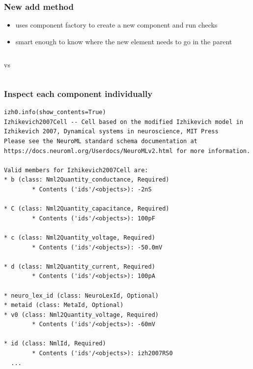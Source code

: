 \begin{frame}[t,fragile]
  \frametitle{New add method}
  \begin{itemize}
    \item uses component factory to create a new component and run checks
    \item smart enough to know where the new element needs to go in the parent
  \end{itemize}
  \begin{center}
    \inputminted[fontsize=\tiny,firstnumber=1,firstline=23,lastline=26,linenos]{python}{./extras/izhikevich-single-neuron.py}
    vs
    \inputminted[fontsize=\tiny,firstnumber=1,firstline=20,lastline=23,linenos]{python}{./extras/izhikevich-single-neuron-dev.py}
  \end{center}
\end{frame}
\begin{frame}[t,fragile]
  \frametitle{Inspect each component individually}
  \begin{verbatim}
izh0.info(show_contents=True)
Izhikevich2007Cell -- Cell based on the modified Izhikevich model in Izhikevich 2007, Dynamical systems in neuroscience, MIT Press
Please see the NeuroML standard schema documentation at https://docs.neuroml.org/Userdocs/NeuroMLv2.html for more information.

Valid members for Izhikevich2007Cell are:
* b (class: Nml2Quantity_conductance, Required)
        * Contents ('ids'/<objects>): -2nS

* C (class: Nml2Quantity_capacitance, Required)
        * Contents ('ids'/<objects>): 100pF

* c (class: Nml2Quantity_voltage, Required)
        * Contents ('ids'/<objects>): -50.0mV

* d (class: Nml2Quantity_current, Required)
        * Contents ('ids'/<objects>): 100pA

* neuro_lex_id (class: NeuroLexId, Optional)
* metaid (class: MetaId, Optional)
* v0 (class: Nml2Quantity_voltage, Required)
        * Contents ('ids'/<objects>): -60mV

* id (class: NmlId, Required)
        * Contents ('ids'/<objects>): izh2007RS0
  ...
  \end{verbatim}
\end{frame}
